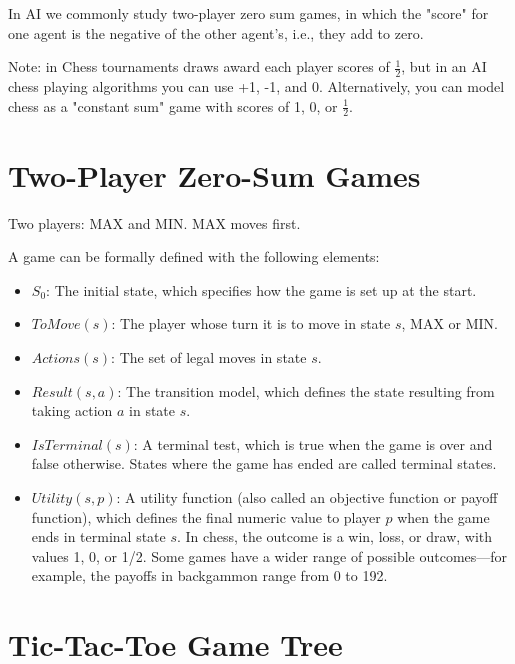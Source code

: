\documentclass[11pt]{article}
\renewenvironment{quote}{\begin{shaded*}\begin{oldquote}}{\end{oldquote}\end{shaded*}}
\begin{document}
In AI we commonly study two-player zero sum games, in which the "score" for one agent is the negative of the other agent's, i.e., they add to zero.

\begin{quote}
Note: in Chess tournaments draws award each player scores of \(\frac{1}{2}\), but in an AI chess playing algorithms you can use +1, -1, and 0.  Alternatively, you can model chess as a "constant sum" game with scores of 1, 0, or \(\frac{1}{2}\).
\end{quote}
\section{Two-Player Zero-Sum Games}
\label{sec:orgb26f7cc}

Two players: MAX and MIN.  MAX moves first.

A game can be formally defined with the following elements:

\begin{itemize}
\item \(S_0\): The initial state, which specifies how the game is set up at the start.

\item \(ToMove(s)\): The player whose turn it is to move in state \(s\), MAX or MIN.

\item \(Actions(s)\): The set of legal moves in state \(s\).

\item \(Result(s, a)\): The transition model, which defines the state resulting from taking action \(a\) in state \(s\).

\item \(IsTerminal(s)\): A terminal test, which is true when the game is over and false otherwise. States where the game has ended are called terminal states.

\item \(Utility(s,p)\): A utility function (also called an objective function or payoff function), which defines the final numeric value to player \(p\) when the game ends in terminal state \(s\).  In chess, the outcome is a win, loss, or draw, with values 1, 0, or 1/2. Some games have a wider range of possible outcomes—for example, the payoffs in backgammon range from 0 to 192.
\end{itemize}
\section{Tic-Tac-Toe Game Tree}
\label{sec:org958aef7}
\end{document}
